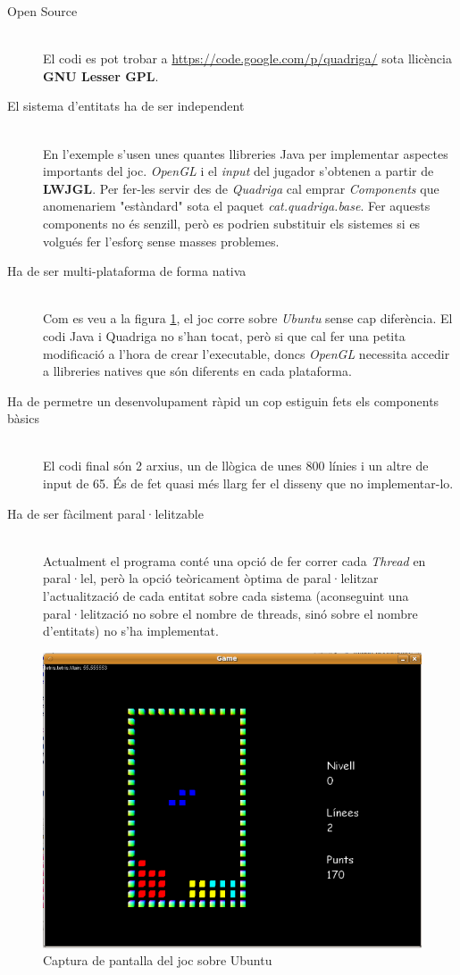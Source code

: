   \begin{description}
    \item[Open Source] \hfill \\
      El codi es pot trobar a \url{https://code.google.com/p/quadriga/} sota llicència {\bf GNU Lesser GPL}.
      
    \item[El sistema d'entitats ha de ser independent] \hfill \\
      En l'exemple s'usen unes quantes llibreries Java per implementar aspectes importants del joc. {\em OpenGL} i el {\em input} del jugador s'obtenen a partir de {\bf LWJGL}. Per fer-les servir des de {\em Quadriga} cal emprar {\em Components} que anomenariem "estàndard" sota el paquet {\em cat.quadriga.base}. Fer aquests components no és senzill, però es podrien substituir els sistemes si es volgués fer l'esforç sense masses problemes.
      
    \item[Ha de ser multi-plataforma de forma nativa] \hfill \\
      Com es veu a la figura \ref{fig:ImatgeUbuntu}, el joc corre sobre {\em Ubuntu} sense cap diferència. El codi Java i Quadriga no s'han tocat, però si que cal fer una petita modificació a l'hora de crear l'executable, doncs {\em OpenGL} necessita accedir a llibreries natives que són diferents en cada plataforma.
      
    \item[Ha de permetre un desenvolupament ràpid un cop estiguin fets els components bàsics] \hfill \\
      El codi final són 2 arxius, un de llògica de unes 800 línies i un altre de input de 65. És de fet quasi més llarg fer el disseny que no implementar-lo.
      
    \item[Ha de ser fàcilment paral·lelitzable] \hfill \\
      Actualment el programa conté una opció de fer correr cada {\em Thread} en paral·lel, però la opció teòricament òptima de paral·lelitzar l'actualització de cada entitat sobre cada sistema (aconseguint una paral·lelització no sobre el nombre de threads, sinó sobre el nombre d'entitats) no s'ha implementat.
  \end{description}
    
  \begin{figure}
    \includegraphics[width=1\linewidth]{./img/ImatgeUbuntu.png}
    \caption{Captura de pantalla del joc sobre Ubuntu \label{fig:ImatgeUbuntu}}
  \end{figure}